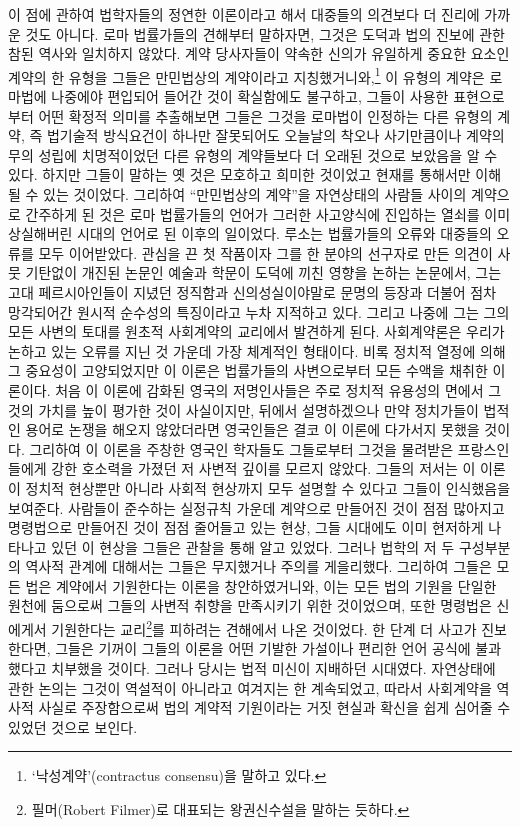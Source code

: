 이 점에 관하여 법학자들의 정연한 이론이라고 해서 대중들의 의견보다 더
진리에 가까운 것도 아니다.
로마 법률가들의 견해부터 말하자면,
그것은 도덕과 법의 진보에 관한 참된 역사와 일치하지 않았다.
계약 당사자들이 약속한 신의가 유일하게 중요한 요소인
계약의 한 유형을 그들은 만민법상의 계약이라고
지칭했거니와,\footnote{%
  `낙성계약'(contractus consensu)을 말하고 있다.
  }
이 유형의 계약은 로마법에 나중에야 편입되어 들어간 것이 확실함에도
불구하고,
그들이 사용한 표현으로부터 어떤 확정적 의미를 추출해보면
그들은 그것을 로마법이 인정하는 다른 유형의 계약, 즉
법기술적 방식요건이 하나만 잘못되어도 오늘날의 착오나 사기만큼이나
계약의무의 성립에 치명적이었던 다른 유형의 계약들보다
더 오래된 것으로 보았음을 알 수 있다.
하지만 그들이 말하는 옛 것은 모호하고 희미한 것이었고
현재를 통해서만 이해될 수 있는 것이었다.
그리하여 ``만민법상의 계약''을
자연상태의 사람들 사이의 계약으로 간주하게 된 것은
로마 법률가들의 언어가
그러한 사고양식에 진입하는 열쇠를 이미 상실해버린 시대의 언어로 된
이후의 일이었다.
루소는 법률가들의 오류와 대중들의 오류를 모두 이어받았다.
관심을 끈 첫 작품이자
그를 한 분야의 선구자로 만든 의견이 사뭇 기탄없이 개진된 논문인
예술과 학문이 도덕에 끼친 영향을 논하는 논문에서,
그는 고대 페르시아인들이 지녔던 정직함과 신의성실이야말로
문명의 등장과 더불어 점차 망각되어간 원시적 순수성의 특징이라고
누차 지적하고 있다.
그리고 나중에 그는
그의 모든 사변의 토대를
원초적 사회계약의 교리에서 발견하게 된다.
사회계약론은 우리가 논하고 있는 오류를 지닌 것 가운데 가장 체계적인 형태이다.
비록 정치적 열정에 의해 그 중요성이 고양되었지만
이 이론은 법률가들의 사변으로부터
모든 수액을 채취한 이론이다.
처음 이 이론에 감화된 영국의 저명인사들은
주로 정치적 유용성의 면에서 그것의 가치를 높이 평가한 것이 사실이지만,
뒤에서 설명하겠으나
만약 정치가들이 법적인 용어로 논쟁을 해오지 않았더라면
영국인들은 결코 이 이론에 다가서지 못했을 것이다.
그리하여 이 이론을 주창한 영국인 학자들도
그들로부터 그것을 물려받은 프랑스인들에게 강한 호소력을 가졌던
저 사변적 깊이를 모르지 않았다.
그들의 저서는 이 이론이 정치적 현상뿐만 아니라
사회적 현상까지 모두 설명할 수 있다고 그들이 인식했음을 보여준다.
사람들이 준수하는 실정규칙 가운데
계약으로 만들어진 것이 점점 많아지고
명령법으로 만들어진 것이 점점 줄어들고 있는 현상,
그들 시대에도 이미 현저하게 나타나고 있던 이 현상을
그들은 관찰을 통해 알고 있었다.
그러나 법학의 저 두 구성부분의 역사적 관계에 대해서는
그들은 무지했거나 주의를 게을리했다.
그리하여
그들은 모든 법은 계약에서 기원한다는 이론을 창안하였거니와, 이는
모든 법의 기원을 단일한 원천에 둠으로써 그들의 사변적 취향을
만족시키기 위한 것이었으며,
또한
명령법은 신에게서 기원한다는 교리\footnote{%
  필머(Robert Filmer)로 대표되는 왕권신수설을 말하는 듯하다.
}를 피하려는 견해에서 나온 것이었다.
한 단계 더 사고가 진보한다면,
그들은 기꺼이
그들의 이론을
어떤 기발한 가설이나 편리한 언어 공식에 불과했다고
치부했을 것이다.
그러나 당시는 법적 미신이 지배하던 시대였다.
자연상태에 관한 논의는 그것이 역설적이 아니라고 여겨지는 한 계속되었고,
따라서
사회계약을 역사적 사실로 주장함으로써
법의 계약적 기원이라는 거짓 현실과 확신을
쉽게 심어줄 수 있었던 것으로 보인다.

